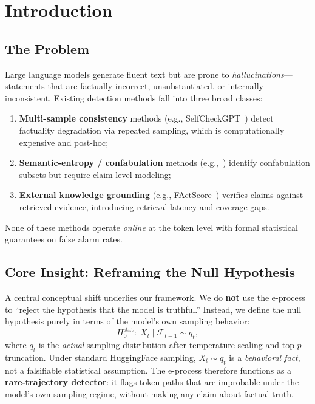 \documentclass[runningheads]{llncs}
\newcommand{\Hnull}{H_0^{\text{stat}}}
\begin{document}
\section{Introduction}

\subsection{The Problem}

Large language models generate fluent text but are prone to
\textit{hallucinations}---statements that are factually incorrect,
unsubstantiated, or internally inconsistent. Existing detection methods
fall into three broad classes:
\begin{enumerate}
    \item \textbf{Multi-sample consistency} methods (e.g., SelfCheckGPT~\cite{manakul2023selfcheck})
          detect factuality degradation via repeated sampling, which is
          computationally expensive and post-hoc;
    \item \textbf{Semantic-entropy / confabulation} methods
          (e.g.,~\cite{farquhar2024detecting}) identify confabulation subsets
          but require claim-level modeling;
    \item \textbf{External knowledge grounding} (e.g., FActScore~\cite{min2023factscore})
          verifies claims against retrieved evidence, introducing retrieval
          latency and coverage gaps.
\end{enumerate}
None of these methods operate \textit{online} at the token level with formal
statistical guarantees on false alarm rates.

\subsection{Core Insight: Reframing the Null Hypothesis}

A central conceptual shift underlies our framework. We do \textbf{not} use the
e-process to ``reject the hypothesis that the model is truthful.'' Instead, we
define the null hypothesis purely in terms of the model's own sampling behavior:
\begin{equation}\label{eq:hnull}
\Hnull:\; X_t \mid \mathcal{F}_{t-1} \sim q_t,
\end{equation}
where $q_t$ is the \textit{actual} sampling distribution after temperature
scaling and top-$p$ truncation. Under standard HuggingFace sampling,
$X_t \sim q_t$ is a \textit{behavioral fact}, not a falsifiable statistical
assumption. The e-process therefore functions as a \textbf{rare-trajectory
detector}: it flags token paths that are improbable under the model's own
sampling regime, without making any claim about factual truth.
\end{document}
